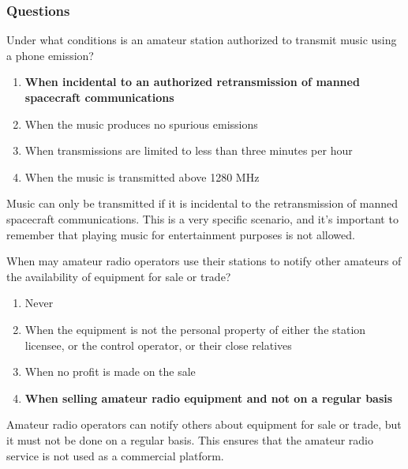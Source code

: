 \subsubsection*{Questions}

\begin{tcolorbox}[colback=gray!10!white,colframe=black!75!black,title={T1D04}]
    Under what conditions is an amateur station authorized to transmit music using a phone emission?
    \begin{enumerate}[label=\Alph*),noitemsep]
        \item \textbf{When incidental to an authorized retransmission of manned spacecraft communications}
        \item When the music produces no spurious emissions
        \item When transmissions are limited to less than three minutes per hour
        \item When the music is transmitted above 1280 MHz
    \end{enumerate}
\end{tcolorbox}

Music can only be transmitted if it is incidental to the retransmission of manned spacecraft communications. This is a very specific scenario, and it's important to remember that playing music for entertainment purposes is not allowed.

\begin{tcolorbox}[colback=gray!10!white,colframe=black!75!black,title={T1D05}]
    When may amateur radio operators use their stations to notify other amateurs of the availability of equipment for sale or trade?
    \begin{enumerate}[label=\Alph*),noitemsep]
        \item Never
        \item When the equipment is not the personal property of either the station licensee, or the control operator, or their close relatives
        \item When no profit is made on the sale
        \item \textbf{When selling amateur radio equipment and not on a regular basis} 
    \end{enumerate}
\end{tcolorbox}

Amateur radio operators can notify others about equipment for sale or trade, but it must not be done on a regular basis. This ensures that the amateur radio service is not used as a commercial platform.


